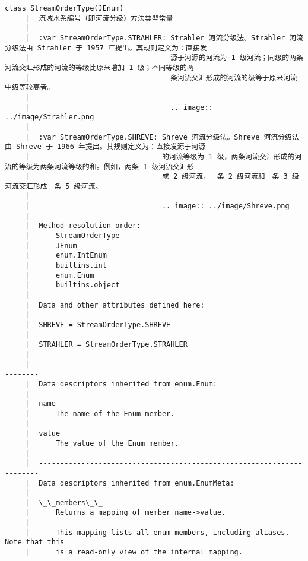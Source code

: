 \documentclass[11pt]{article}
\begin{document}
\begin{Verbatim}[commandchars=\\\{\}]
    class StreamOrderType(JEnum)
     |  流域水系编号（即河流分级）方法类型常量
     |  
     |  :var StreamOrderType.STRAHLER: Strahler 河流分级法。Strahler 河流分级法由 Strahler 于 1957 年提出。其规则定义为：直接发
     |                                 源于河源的河流为 1 级河流；同级的两条河流交汇形成的河流的等级比原来增加 1 级；不同等级的两
     |                                 条河流交汇形成的河流的级等于原来河流中级等较高者。
     |  
     |                                 .. image:: ../image/Strahler.png
     |  
     |  :var StreamOrderType.SHREVE: Shreve 河流分级法。Shreve 河流分级法由 Shreve 于 1966 年提出。其规则定义为：直接发源于河源
     |                               的河流等级为 1 级，两条河流交汇形成的河流的等级为两条河流等级的和。例如，两条 1 级河流交汇形
     |                               成 2 级河流，一条 2 级河流和一条 3 级河流交汇形成一条 5 级河流。
     |  
     |                               .. image:: ../image/Shreve.png
     |  
     |  Method resolution order:
     |      StreamOrderType
     |      JEnum
     |      enum.IntEnum
     |      builtins.int
     |      enum.Enum
     |      builtins.object
     |  
     |  Data and other attributes defined here:
     |  
     |  SHREVE = StreamOrderType.SHREVE
     |  
     |  STRAHLER = StreamOrderType.STRAHLER
     |  
     |  ----------------------------------------------------------------------
     |  Data descriptors inherited from enum.Enum:
     |  
     |  name
     |      The name of the Enum member.
     |  
     |  value
     |      The value of the Enum member.
     |  
     |  ----------------------------------------------------------------------
     |  Data descriptors inherited from enum.EnumMeta:
     |  
     |  \_\_members\_\_
     |      Returns a mapping of member name->value.
     |      
     |      This mapping lists all enum members, including aliases. Note that this
     |      is a read-only view of the internal mapping.
    

\end{Verbatim}
\end{document}
